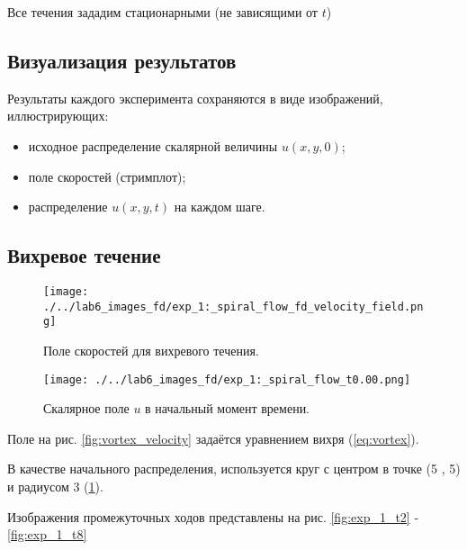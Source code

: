 Все течения зададим стационарными (не зависящими от $t$)
\subsection{Визуализация результатов}

Результаты каждого эксперимента сохраняются в виде изображений, иллюстрирующих:
\begin{itemize}
	\item исходное распределение скалярной величины \(u(x,y,0)\);
	\item поле скоростей (стримплот);
	\item распределение \(u(x,y,t)\) на каждом шаге.
\end{itemize}
\pagebreak
\subsection{Вихревое течение}
\begin{figure}
	\centering
	\begin{minipage}[b]{0.48\textwidth}
		\centering
	\texttt{[image: ./../lab6\_images\_fd/exp\_1:\_spiral\_flow\_fd\_velocity\_field.png]}
	\caption{Поле скоростей для вихревого течения.}
	\label{fig:vortex_velocity}
	\end{minipage}
	\hfill
	\begin{minipage}[b]{0.48\textwidth}
		\centering
	\texttt{[image: ./../lab6\_images\_fd/exp\_1:\_spiral\_flow\_t0.00.png]}
	\caption{Скалярное поле \(u\) в начальный момент времени.}
	\label{fig:vortex_begin}
	\end{minipage}
\end{figure}

Поле на рис. \ref{fig:vortex_velocity} задаётся уравнением вихря (\ref{eq:vortex}).

В качестве начального распределения, используется круг с центром в точке (5 , 5) и радиусом 3 (\ref{fig:vortex_begin}).

Изображения промежуточных ходов представлены на рис. \ref{fig:exp_1_t2} - \ref{fig:exp_1_t8}


